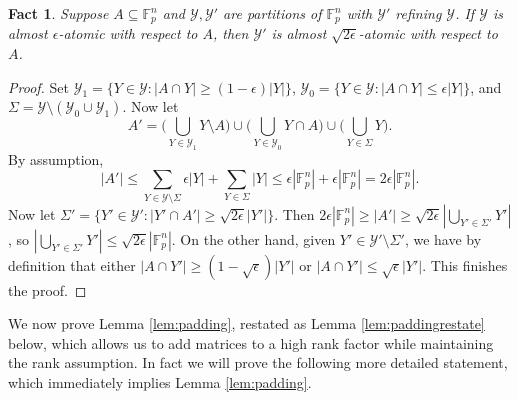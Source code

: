 \documentclass[12pt,oneside,british,a4wide]{amsart}
\newtheorem{fact}[theorem]{Fact}
\numberwithin{equation}{section}
\theoremstyle{definition}
\def\F{\mathbb{F}}
\def\e{\epsilon}
\newcommand{\calY}{\mathcal{Y}}
\begin{document}
\begin{fact}\label{fact:aveofavecorrestate}
Suppose $A\subseteq \F_p^n$ and $\calY,\calY'$ are partitions of $\F_p^n$ with $\calY'$ refining $\calY$.  If $\calY$ is almost $\e$-atomic with respect to $A$, then $\calY'$ is almost $\sqrt{2\e}$-atomic with respect to $A$. 
\end{fact}
\begin{proof}
Set $\calY_1=\{Y\in \calY: |A\cap Y|\geq (1-\e)|Y|\}$,  $\calY_0=\{Y\in \calY: |A\cap Y|\leq \e |Y|\}$, and $\Sigma=\calY\setminus (\calY_0\cup \calY_1)$.  Now let 
$$
A'=\Big(\bigcup_{Y\in \calY_1}Y\setminus A\Big)\cup \Big(\bigcup_{Y\in \calY_0}Y\cap A\Big)\cup \Big(\bigcup_{Y\in\Sigma}  Y \Big).
$$
By assumption, 
$$
|A'|\leq \sum_{Y\in \calY\setminus \Sigma}\e|Y|+\sum_{Y\in \Sigma}|Y|\leq \e|\F_p^n|+\e|\F_p^n|=2\e|\F_p^n|.
$$
Now let $\Sigma'=\{Y'\in \calY': |Y'\cap A'|\geq \sqrt{2\e}|Y'|\}$.  Then   $2\e|\F_p^n|\geq |A'|\geq \sqrt{2\e}|\bigcup_{Y'\in \Sigma'}Y'|$, so  $|\bigcup_{Y'\in \Sigma'}Y'|\leq \sqrt{2\e}|\F_p^n|$.  On the other hand, given $Y'\in \calY'\setminus \Sigma'$, we have by definition that either $|A\cap Y'|\geq (1-\sqrt{\e})|Y'|$ or $|A\cap Y'|\leq \sqrt{\e}|Y'|$. This finishes the proof.  
\end{proof}

We now prove Lemma \ref{lem:padding}, restated as Lemma \ref{lem:paddingrestate} below, which allows us to add matrices to a high rank factor while maintaining the rank assumption.  In fact we will prove the following more detailed statement, which immediately implies Lemma \ref{lem:padding}.
\end{document}

